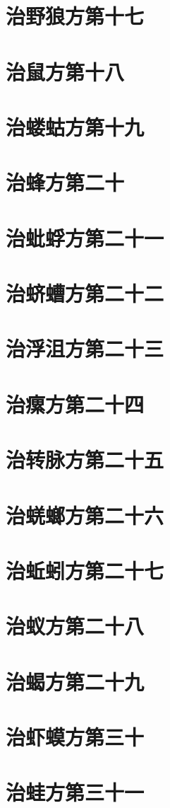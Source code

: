 \documentclass[a4paper,12pt,UTF8,twoside]{ctexbook}
\begin{document}
\chapter{治野狼方第十七}
\chapter{治鼠方第十八}
\chapter{治蝼蛄方第十九}
\chapter{治蜂方第二十}
\chapter{治蚍蜉方第二十一}
\chapter{治蛴螬方第二十二}
\chapter{治浮沮方第二十三}
\chapter{治瘰方第二十四}
\chapter{治转脉方第二十五}
\chapter{治蜣螂方第二十六}
\chapter{治蚯蚓方第二十七}
\chapter{治蚁方第二十八}
\chapter{治蝎方第二十九}
\chapter{治虾蟆方第三十}
\chapter{治蛙方第三十一}
\end{document}
